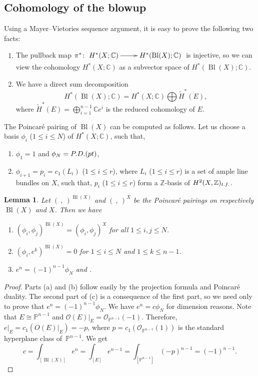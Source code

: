 \documentclass[10pt,a4paper]{article}
\numberwithin{equation}{section}
\newtheorem{Lemma}[Theorem]{Lemma}
\newcommand{\CC}{\mathbb{C}}
\newcommand{\ZZ}{\mathbb{Z}}
\newcommand{\PP}{\mathbb{P}}
\renewcommand{\O}{\mathcal{O}}
\begin{document}
\subsection{Cohomology of the blowup}
\label{sec:coh_blowup}
Using a Mayer--Vietories sequence
argument, it is easy to prove the following two facts:
\begin{enumerate}\itemsep=0pt
 \item[(1)]
The pullback map $\pi^*\colon\xymatrix{H^*(X;\CC)\ar[r] &
 H^*(\operatorname{Bl}(X);\CC)}$ is injective, so we can view the
 cohomology $H^*(X;\CC)$ as a subvector space of
 $H^*(\operatorname{Bl}(X);\CC)$.
\item[(2)]
 We have a direct sum decomposition
 \[
 H^*(\operatorname{Bl}(X);\CC) = H^*(X;\CC)\bigoplus
 \widetilde{H}^*(E),
 \]
 where $\widetilde{H}^*(E)= \bigoplus_{i=1}^{n-1} \CC e^i$ is the
 reduced cohomology of $E$.
\end{enumerate}
The Poincar\'e pairing of $\operatorname{Bl}(X)$ can be computed as follows.
Let us choose a basis $\phi_i$ ($1\leq i\leq N$) of
$H^*(X;\CC)$, such that,
\begin{enumerate}\itemsep=0pt
\item[(i)]
 $\phi_1=1$ and $\phi_N={\rm P.D.}({\rm pt})$,
\item[(ii)]
 $\phi_{i+1} =p_i=c_1(L_i)$ ($1\leq i\leq r$), where $L_i$ ($1\leq
 i\leq r$) is a set of ample line bundles on $X$, such that, $p_i$ ($1\leq
 i\leq r$) form a $\ZZ$-basis of $H^2(X,\ZZ)_{\rm t.f.}$.
\end{enumerate}
\begin{Lemma}\label{le:pp}
 Let $(\ ,\ )^{\operatorname{Bl}(X)}$ and $(\ ,\ )^X$ be the Poincar\'e
 pairings on respectively $ \operatorname{Bl}(X)$ and $X$. Then we have
\begin{enumerate}\itemsep=0pt
\item[$(a)$] $(\phi_i,\phi_j )^{\operatorname{Bl}(X)} = (\phi_i,\phi_j )^X$ for all
$1\leq i,j\leq N$.
\item[$(b)$] $(\phi_i,e^k )^{\operatorname{Bl}(X)} =0$ for $1\leq i\leq N$ and $1\leq
k\leq n-1$.
\item[$(c)$] $e^n=(-1)^{n-1} \phi_N$ and .
\end{enumerate}
\end{Lemma}
\begin{proof}
Parts (a) and (b) follow easily by the projection formula and Poincar\'e
duality. The second part of (c) is a consequence of the first part, so
we need only to prove that $e^n=(-1)^{n-1} \phi_N$. We have $e^n=c
\phi_N$ for dimension reasons. Note that
$E\cong \mathbb{P}^{n-1}$ and
$\O(E)|_E=\O_{\PP^{n-1}}(-1)$. Therefore, $e|_E=c_1(O(E)|_E) = -p$,
where $p=c_1(\O_{\PP^{n-1}}(1))$ is the standard hyperplane class of~$\PP^{n-1}$. We get
\[
c=\int_{[\operatorname{Bl}(X)]} e^n = \int_{[E]} e^{n-1} = \int_{[\PP^{n-1}]}
(-p)^{n-1} = (-1)^{n-1}.\tag*{\qed}
\]\renewcommand{\qed}{}
\end{proof}
\end{document}
